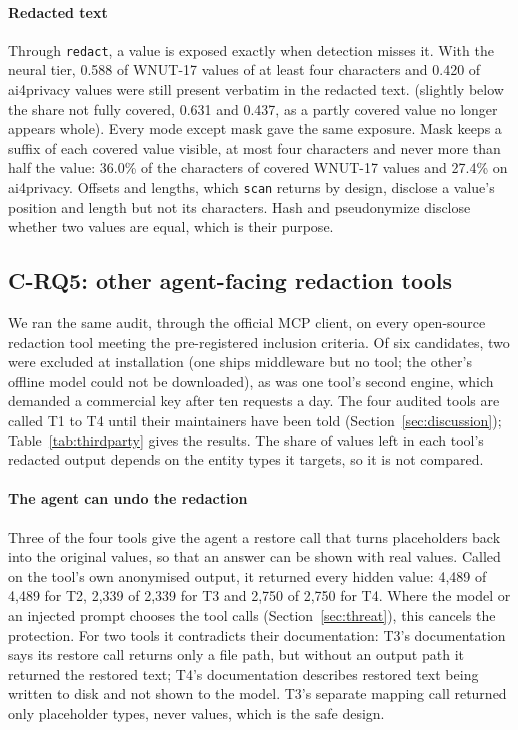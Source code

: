 \paragraph{Redacted text} Through \texttt{redact}, a value is exposed exactly when detection misses it. With the neural tier, 0.588 of WNUT-17 values of at least four characters and 0.420 of ai4privacy values were still present verbatim in the redacted text. (slightly below the share not fully covered, 0.631 and 0.437, as a partly covered value no longer appears whole). Every mode except mask gave the same exposure. Mask keeps a suffix of each covered value visible, at most four characters and never more than half the value: 36.0\% of the characters of covered WNUT-17 values and 27.4\% on ai4privacy. Offsets and lengths, which \texttt{scan} returns by design, disclose a value's position and length but not its characters. Hash and pseudonymize disclose whether two values are equal, which is their purpose.

\subsection{C-RQ5: other agent-facing redaction tools}\label{sec:thirdparty}



We ran the same audit, through the official MCP client, on every open-source redaction tool meeting the pre-registered inclusion criteria. Of six candidates, two were excluded at installation (one ships middleware but no tool; the other's offline model could not be downloaded), as was one tool's second engine, which demanded a commercial key after ten requests a day. The four audited tools are called T1 to T4 until their maintainers have been told (Section~\ref{sec:discussion}); Table~\ref{tab:thirdparty} gives the results. The share of values left in each tool's redacted output depends on the entity types it targets, so it is not compared.

\paragraph{The agent can undo the redaction} Three of the four tools give the agent a restore call that turns placeholders back into the original values, so that an answer can be shown with real values. Called on the tool's own anonymised output, it returned every hidden value: 4,489 of 4,489 for T2, 2,339 of 2,339 for T3 and 2,750 of 2,750 for T4. Where the model or an injected prompt chooses the tool calls (Section~\ref{sec:threat}), this cancels the protection. For two tools it contradicts their documentation: T3's documentation says its restore call returns only a file path, but without an output path it returned the restored text; T4's documentation describes restored text being written to disk and not shown to the model. T3's separate mapping call returned only placeholder types, never values, which is the safe design.

